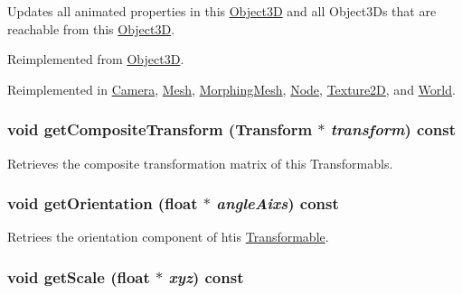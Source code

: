 Updates all animated properties in this \hyperlink{classm3g_1_1Object3D}{Object3D} and all Object3Ds that are reachable from this \hyperlink{classm3g_1_1Object3D}{Object3D}. 

Reimplemented from \hyperlink{classm3g_1_1Object3D_8aad1ceab4c2a03609c8a42324ce484d}{Object3D}.

Reimplemented in \hyperlink{classm3g_1_1Camera_8aad1ceab4c2a03609c8a42324ce484d}{Camera}, \hyperlink{classm3g_1_1Mesh_82cfeb67ca66b93e2ca7bda9a4f0e2aa}{Mesh}, \hyperlink{classm3g_1_1MorphingMesh_8aad1ceab4c2a03609c8a42324ce484d}{MorphingMesh}, \hyperlink{classm3g_1_1Node_8aad1ceab4c2a03609c8a42324ce484d}{Node}, \hyperlink{classm3g_1_1Texture2D_82cfeb67ca66b93e2ca7bda9a4f0e2aa}{Texture2D}, and \hyperlink{classm3g_1_1World_8aad1ceab4c2a03609c8a42324ce484d}{World}.\hypertarget{classm3g_1_1Transformable_263ef66efed11b7f9678e2e4bbec4c55}{
\subsubsection[{getCompositeTransform}]{\setlength{\rightskip}{0pt plus 5cm}void getCompositeTransform ({\bf Transform} $\ast$ {\em transform}) const}}
\label{classm3g_1_1Transformable_263ef66efed11b7f9678e2e4bbec4c55}


Retrieves the composite transformation matrix of this Transformabls. \hypertarget{classm3g_1_1Transformable_f4df4d4858762f23a5562f7192e6d53c}{
\subsubsection[{getOrientation}]{\setlength{\rightskip}{0pt plus 5cm}void getOrientation (float $\ast$ {\em angleAixs}) const}}
\label{classm3g_1_1Transformable_f4df4d4858762f23a5562f7192e6d53c}


Retriees the orientation component of htis \hyperlink{classm3g_1_1Transformable}{Transformable}. \hypertarget{classm3g_1_1Transformable_b8a2dd11d0ba90e138625eb86a6a6083}{
\subsubsection[{getScale}]{\setlength{\rightskip}{0pt plus 5cm}void getScale (float $\ast$ {\em xyz}) const}}
\label{classm3g_1_1Transformable_b8a2dd11d0ba90e138625eb86a6a6083}


